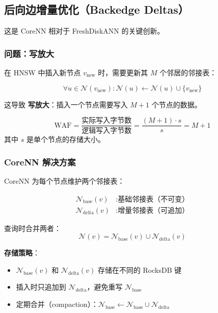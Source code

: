 \subsection{后向边增量优化（Backedge Deltas）}

这是 CoreNN 相对于 FreshDiskANN 的关键创新。

\subsubsection{问题：写放大}

在 HNSW 中插入新节点 $v_{\text{new}}$ 时，需要更新其 $M$ 个邻居的邻接表：

\begin{equation}
\forall u \in \mathcal{N}(v_{\text{new}}): \mathcal{N}(u) \gets \mathcal{N}(u) \cup \{v_{\text{new}}\}
\end{equation}

这导致 \textbf{写放大}：插入一个节点需要写入 $M+1$ 个节点的数据。

\begin{definition}[写放大因子]
\begin{equation}
\text{WAF} = \frac{\text{实际写入字节数}}{\text{逻辑写入字节数}} = \frac{(M+1) \cdot s}{s} = M+1
\end{equation}
其中 $s$ 是单个节点的存储大小。
\end{definition}

\subsubsection{CoreNN 解决方案}

CoreNN 为每个节点维护两个邻接表：

\begin{equation}
\begin{aligned}
\mathcal{N}_{\text{base}}(v) &: \text{基础邻接表（不可变）} \\
\mathcal{N}_{\text{delta}}(v) &: \text{增量邻接表（可追加）}
\end{aligned}
\end{equation}

查询时合并两者：
\begin{equation}
\mathcal{N}(v) = \mathcal{N}_{\text{base}}(v) \cup \mathcal{N}_{\text{delta}}(v)
\end{equation}

\textbf{存储策略}：
\begin{itemize}
    \item $\mathcal{N}_{\text{base}}(v)$ 和 $\mathcal{N}_{\text{delta}}(v)$ 存储在不同的 RocksDB 键
    \item 插入时只追加到 $\mathcal{N}_{\text{delta}}$，避免重写 $\mathcal{N}_{\text{base}}$
    \item 定期合并（compaction）：$\mathcal{N}_{\text{base}} \gets \mathcal{N}_{\text{base}} \cup \mathcal{N}_{\text{delta}}$
\end{itemize}


